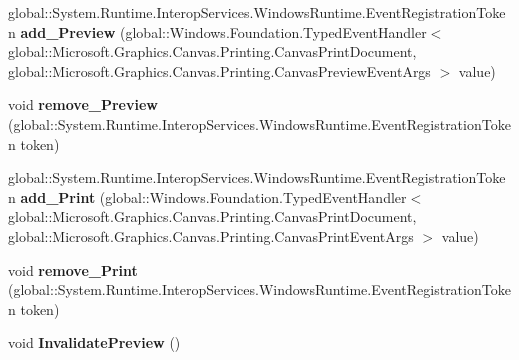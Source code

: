 \begin{DoxyCompactItemize}
\item 
\mbox{\label{class_microsoft_1_1_graphics_1_1_canvas_1_1_printing_1_1_canvas_print_document_a27f47fca50c0e59ac08d765c11296386}} 
global\+::\+System.\+Runtime.\+Interop\+Services.\+Windows\+Runtime.\+Event\+Registration\+Token {\bfseries add\+\_\+\+Preview} (global\+::\+Windows.\+Foundation.\+Typed\+Event\+Handler$<$ global\+::\+Microsoft.\+Graphics.\+Canvas.\+Printing.\+Canvas\+Print\+Document, global\+::\+Microsoft.\+Graphics.\+Canvas.\+Printing.\+Canvas\+Preview\+Event\+Args $>$ value)
\item 
\mbox{\label{class_microsoft_1_1_graphics_1_1_canvas_1_1_printing_1_1_canvas_print_document_aa7beedc13a3a13307163655bbab18019}} 
void {\bfseries remove\+\_\+\+Preview} (global\+::\+System.\+Runtime.\+Interop\+Services.\+Windows\+Runtime.\+Event\+Registration\+Token token)
\item 
\mbox{\label{class_microsoft_1_1_graphics_1_1_canvas_1_1_printing_1_1_canvas_print_document_a9da3eaf71e29837bb52c49b799a88293}} 
global\+::\+System.\+Runtime.\+Interop\+Services.\+Windows\+Runtime.\+Event\+Registration\+Token {\bfseries add\+\_\+\+Print} (global\+::\+Windows.\+Foundation.\+Typed\+Event\+Handler$<$ global\+::\+Microsoft.\+Graphics.\+Canvas.\+Printing.\+Canvas\+Print\+Document, global\+::\+Microsoft.\+Graphics.\+Canvas.\+Printing.\+Canvas\+Print\+Event\+Args $>$ value)
\item 
\mbox{\label{class_microsoft_1_1_graphics_1_1_canvas_1_1_printing_1_1_canvas_print_document_a247a72beac098c3ac4e60deec5108fb3}} 
void {\bfseries remove\+\_\+\+Print} (global\+::\+System.\+Runtime.\+Interop\+Services.\+Windows\+Runtime.\+Event\+Registration\+Token token)
\item 
\mbox{\label{class_microsoft_1_1_graphics_1_1_canvas_1_1_printing_1_1_canvas_print_document_a8bbb671d9de2e348757da7e7d7c1935c}} 
void {\bfseries Invalidate\+Preview} ()
\item 

\end{DoxyCompactItemize}

